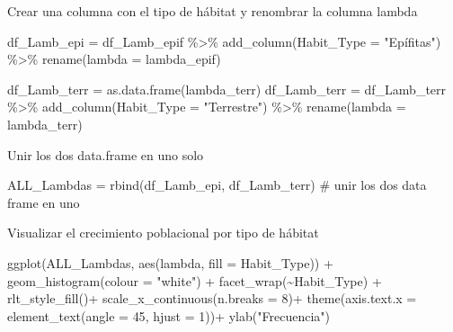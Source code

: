 \documentclass[
  12pt,
  letterpaper,
]{book}
\newenvironment{Shaded}{\begin{snugshade}}{\end{snugshade}}
\newcommand{\AttributeTok}[1]{\textcolor[rgb]{0.40,0.45,0.13}{#1}}
\newcommand{\CommentTok}[1]{\textcolor[rgb]{0.37,0.37,0.37}{#1}}
\newcommand{\DecValTok}[1]{\textcolor[rgb]{0.68,0.00,0.00}{#1}}
\newcommand{\FunctionTok}[1]{\textcolor[rgb]{0.28,0.35,0.67}{#1}}
\newcommand{\NormalTok}[1]{\textcolor[rgb]{0.00,0.23,0.31}{#1}}
\newcommand{\OtherTok}[1]{\textcolor[rgb]{0.00,0.23,0.31}{#1}}
\newcommand{\SpecialCharTok}[1]{\textcolor[rgb]{0.37,0.37,0.37}{#1}}
\newcommand{\StringTok}[1]{\textcolor[rgb]{0.13,0.47,0.30}{#1}}
\begin{document}
Crear una columna con el tipo de hábitat y renombrar la columna lambda

\begin{Shaded}
\begin{Highlighting}[]
\NormalTok{df\_Lamb\_epi }\OtherTok{=}\NormalTok{ df\_Lamb\_epif }\SpecialCharTok{\%\textgreater{}\%}
  \FunctionTok{add\_column}\NormalTok{(}\AttributeTok{Habit\_Type =} \StringTok{"Epífitas"}\NormalTok{) }\SpecialCharTok{\%\textgreater{}\%}
  \FunctionTok{rename}\NormalTok{(}\AttributeTok{lambda =}\NormalTok{ lambda\_epif)}


\NormalTok{df\_Lamb\_terr }\OtherTok{=} \FunctionTok{as.data.frame}\NormalTok{(lambda\_terr)}
\NormalTok{df\_Lamb\_terr }\OtherTok{=}\NormalTok{ df\_Lamb\_terr }\SpecialCharTok{\%\textgreater{}\%}
  \FunctionTok{add\_column}\NormalTok{(}\AttributeTok{Habit\_Type =} \StringTok{"Terrestre"}\NormalTok{) }\SpecialCharTok{\%\textgreater{}\%}
  \FunctionTok{rename}\NormalTok{(}\AttributeTok{lambda =}\NormalTok{ lambda\_terr)}
\end{Highlighting}
\end{Shaded}

Unir los dos data.frame en uno solo

\begin{Shaded}
\begin{Highlighting}[]
\NormalTok{ALL\_Lambdas }\OtherTok{=} \FunctionTok{rbind}\NormalTok{(df\_Lamb\_epi, df\_Lamb\_terr) }\CommentTok{\# unir los dos data frame en uno}
\end{Highlighting}
\end{Shaded}

Visualizar el crecimiento poblacional por tipo de hábitat

\begin{Shaded}
\begin{Highlighting}[]
\FunctionTok{ggplot}\NormalTok{(ALL\_Lambdas, }\FunctionTok{aes}\NormalTok{(lambda, }\AttributeTok{fill =}\NormalTok{ Habit\_Type)) }\SpecialCharTok{+}
  \FunctionTok{geom\_histogram}\NormalTok{(}\AttributeTok{colour =} \StringTok{"white"}\NormalTok{) }\SpecialCharTok{+}
  \FunctionTok{facet\_wrap}\NormalTok{(}\SpecialCharTok{\textasciitilde{}}\NormalTok{Habit\_Type) }\SpecialCharTok{+}
  \FunctionTok{rlt\_style\_fill}\NormalTok{()}\SpecialCharTok{+}
  \FunctionTok{scale\_x\_continuous}\NormalTok{(}\AttributeTok{n.breaks =} \DecValTok{8}\NormalTok{)}\SpecialCharTok{+}
  \FunctionTok{theme}\NormalTok{(}\AttributeTok{axis.text.x =} \FunctionTok{element\_text}\NormalTok{(}\AttributeTok{angle =} \DecValTok{45}\NormalTok{, }\AttributeTok{hjust =} \DecValTok{1}\NormalTok{))}\SpecialCharTok{+}
  \FunctionTok{ylab}\NormalTok{(}\StringTok{"Frecuencia"}\NormalTok{)}
\end{Highlighting}
\end{Shaded}
\end{document}
